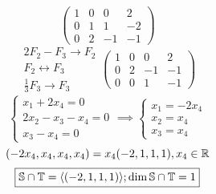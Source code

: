 \documentclass[../practica.root.tex]{subfiles}
\begin{document}
\begin{enumerate}
\begin{enumerate}
\[\begin{pmatrix}
                            1 & 0 & 0  & 2  \\
                            0 & 1 & 1  & -2 \\
                            0 & 2 & -1 & -1
                        \end{pmatrix}
                    \] \[
                        \begin{array}{rl}
                            2F_2 - F_3 \to F_2      \\
                            F_2 \leftrightarrow F_3 \\
                            \frac{1}{3}F_3 \to F_3
                        \end{array}
                        \begin{pmatrix}
                            1 & 0 & 0  & 2  \\
                            0 & 2 & -1 & -1 \\
                            0 & 0 & 1  & -1
                        \end{pmatrix}
                    \] \[
                        \begin{cases}
                            x_1 + 2x_4 = 0       \\
                            2x_2 - x_3 - x_4 = 0 \\
                            x_3 - x_4 = 0
                        \end{cases}
                        \implies
                        \begin{cases}
                            x_1 = -2x_4 \\
                            x_2 = x_4   \\
                            x_3 = x_4
                        \end{cases}
                    \]
                    \[ (-2x_4, x_4, x_4, x_4) = x_4(-2,1,1,1), x_4 \in \mathbb{R} \]
                    \[ \boxed{\mathbb{S} \cap \mathbb{T} = \langle (-2,1,1,1) \rangle; \dim{\mathbb{S}\cap \mathbb{T}} = 1} \]


\end{enumerate}
\end{enumerate}
\end{document}
